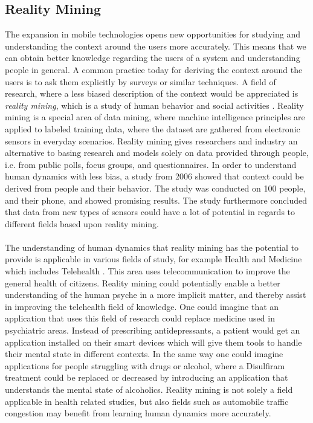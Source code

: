 \subsection{Reality Mining}
\label{sub:reality_mining}
The expansion in mobile technologies opens new opportunities for studying and understanding the context around the users more accurately. This means that we can obtain better knowledge regarding the users of a system and understanding people in general. A common practice today for deriving the context around the users is to ask them explicitly by surveys or similar techniques. A field of research, where a less biased description of the context would be appreciated is \emph{reality mining}, which is a study of human behavior and social activities \parencite{madan2009_reality_mining_privacy}. Reality mining is a special area of data mining, where machine intelligence principles are applied to labeled training data, where the dataset are gathered from electronic sensors in everyday scenarios. Reality mining gives researchers and industry an alternative to basing research and models solely on data provided through people, i.e. from public polls, focus groups, and questionnaires. In order to understand human dynamics with less bias, a study from 2006 \parencite{eagle2006_reality_mining_definition} showed that context could be derived from people and their behavior. The study was conducted on 100 people, and their phone, and showed promising results. The study furthermore concluded that data from new types of sensors could have a lot of potential in regards to different fields based upon reality mining. 
\\\\
The understanding of human dynamics that reality mining has the potential to provide is applicable in various fields of study, for example Health and Medicine \parencite{pentland2009_reality_mining_health_medicine} which includes Telehealth \parencite{telehealth_aau}. This area uses telecommunication to improve the general health of citizens. Reality mining could potentially enable a better understanding of the human psyche in a more implicit matter, and thereby assist in improving the telehealth field of knowledge. One could imagine that an application that uses this field of research could replace medicine used in psychiatric areas. Instead of prescribing antidepressants, a patient would get an application installed on their smart devices which will give them tools to handle their mental state in different contexts. In the same way one could imagine applications for people struggling with drugs or alcohol, where a Disulfiram \parencite{nlm_disulfiram} treatment could be replaced or decreased by introducing an application that understands the mental state of alcoholics. Reality mining is not solely a field applicable in health related studies, but also fields such as automobile traffic congestion \parencite{pentland2009reality_mining_mobile_communication_gps} may benefit from learning human dynamics more accurately.
